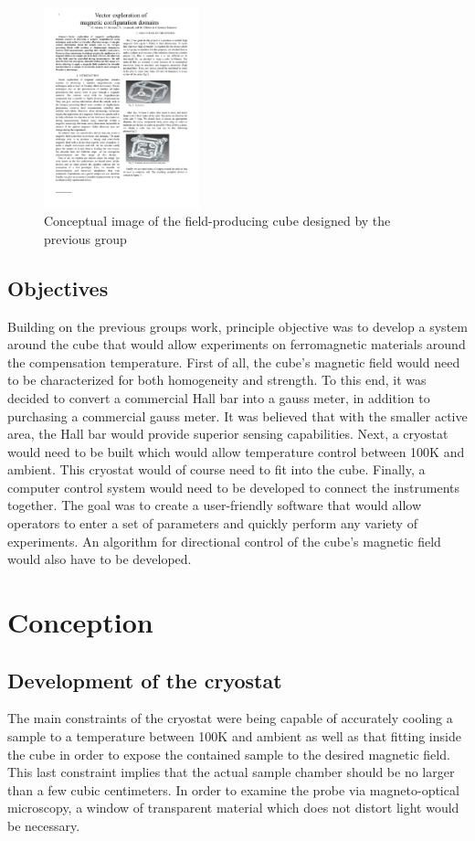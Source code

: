 \documentclass[journal]{IEEEtran}
\begin{document}
\begin{figure}[h]
\centering
\includegraphics[width=0.4\textwidth]{cube}
\caption{Conceptual image of the field-producing cube designed by the previous group}
\label{f cube}
\end{figure}

\subsection{Objectives}
Building on the previous groups work, principle objective was to develop a system around the cube that would allow experiments on ferromagnetic materials around the compensation temperature. First of all, the cube's magnetic field would need to be characterized for both homogeneity and strength. To this end, it was decided to convert a commercial Hall bar into a gauss meter, in addition to purchasing a commercial gauss meter. It was believed that with the smaller active area, the Hall bar would provide superior sensing capabilities. Next, a cryostat would need to be built which would allow temperature control between 100K and ambient. This cryostat would of course need to fit into the cube. Finally, a computer control system would need to be developed to connect the instruments together. The goal was to create a user-friendly software that would allow operators to enter a set of parameters and quickly perform any variety of experiments. An algorithm for directional control of the cube's magnetic field would also have to be developed. 



\section{Conception}
\subsection{Development of the cryostat}
The main constraints of the cryostat were being capable of accurately cooling a sample to a temperature between 100K and ambient as well as that fitting inside the cube in order to expose the contained sample to the desired magnetic field. This last constraint implies that the actual sample chamber should be no larger than a few cubic centimeters. 
In order to examine the probe via magneto-optical microscopy, a window of transparent material which does not distort light would be necessary.
\end{document}
